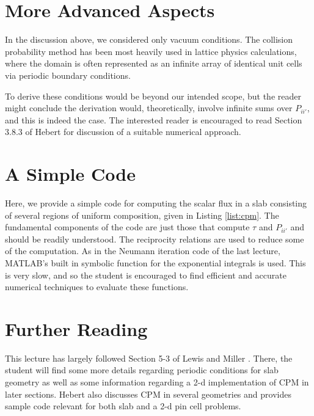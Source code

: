 \section*{More Advanced Aspects}

In the discussion above, we considered only vacuum conditions.  The collision probability method has been most heavily used in lattice physics calculations, where the domain is often represented as an infinite array of identical unit cells via periodic boundary conditions.  

To derive these conditions would be beyond our intended scope, but the reader might conclude the derivation would, theoretically, involve infinite sums over $P_{ii'}$, and this is indeed the case.  The interested reader is encouraged to read Section 3.8.3 of Hebert \cite{hebert2009arp} for discussion of a suitable numerical approach.

\section*{A Simple Code}

Here, we provide a simple code for computing the scalar flux in a slab consisting of several regions of uniform composition, given in Listing \ref{list:cpm}.  The fundamental components of the code are just those that compute $\tau$ and $P_{ii'}$ and should be readily understood.  The reciprocity relations are used to reduce some of the computation.  As in the Neumann iteration code of the last lecture, MATLAB's built in symbolic function for the exponential integrals is used.  This is very slow, and so the student is encouraged to find efficient and accurate numerical techniques to evaluate these functions.



\section*{Further Reading}

This lecture has largely followed Section 5-3 of Lewis and Miller \cite{lewis1993cmn}.  There, the student will find some more details regarding periodic conditions for slab geometry as well as some information regarding a 2-d implementation of CPM in later sections.  Hebert \cite{hebert2009arp} also discusses CPM in several geometries and provides sample code relevant for both slab and a 2-d pin cell problems.

